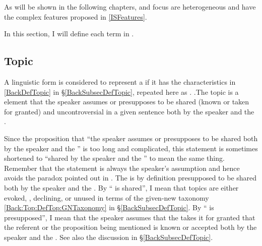 As will be shown in the following chapters,
 and focus are heterogeneous
and have the complex features proposed in \ref{ISFeatures}.

In this section,
I will define each term in \Last.

\subsection{Topic}\label{FrameworkTopic}

A linguistic form is considered to represent a  if it has the characteristics in \ref{BackDefTopic} in \S \ref{BackSubsecDefTopic},
repeated here as \Next.
%
\ex.\label{FrameworkTopicDef}The topic is a  element that the speaker assumes or presupposes to be shared (known or taken for granted) and uncontroversial in a given sentence both by the speaker and the .

%
Since the proposition that ``the speaker assumes or presupposes to be shared both by the speaker and the '' is too long and complicated,
this statement is sometimes shortened to ``shared by the speaker and the '' to mean the same thing.
Remember that the statement is always the speaker's assumption
and hence avoids the paradox pointed out in .
The  is by definition presupposed to be shared both by the speaker and the .
By `` is shared'',
I mean that topics are either evoked, , declining, or unused
in terms of the given-new taxonomy \ref{Back:Top:DefTop:GNTaxonomy} in \S \ref{BackSubsecDefTopic}.
By `` is presupposed'',
I mean that the speaker assumes that the  takes it for granted that the referent or the proposition being mentioned is known or accepted both by the speaker and the .
See also the discussion in \S \ref{BackSubsecDefTopic}.

